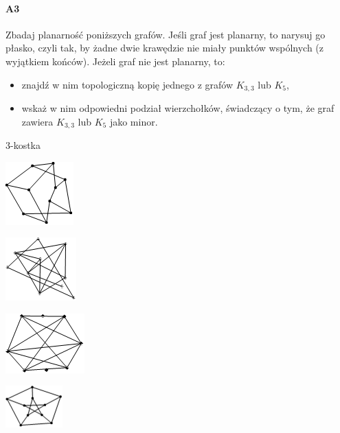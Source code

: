 \paragraph{A3} Zbadaj planarność poniższych grafów. Jeśli graf jest planarny, to narysuj go płasko, czyli tak, by żadne dwie krawędzie nie miały punktów wspólnych (z wyjątkiem końców). Jeżeli graf nie jest planarny, to:
\begin{itemize}
\item znajdź w nim topologiczną kopię jednego z grafów $K_{3,3}$ lub $K_5$,
\item wskaż w nim odpowiedni podział wierzchołków, świadczący o tym, że graf zawiera $K_{3,3}$ lub $K_5$ jako minor.
\end{itemize}
\begin{enumerate}[label=\alph*)]
\begin{minipage}{.25\textwidth}
\item 3-kostka
\end{minipage}
\begin{minipage}{.25\textwidth}
\item \includegraphics{img/g4}
\end{minipage}
\begin{minipage}{.25\textwidth}
\item \includegraphics{img/g5}
\end{minipage}
\begin{minipage}{.25\textwidth}
\item \includegraphics{img/g6}
\end{minipage}
\begin{minipage}{.25\textwidth}
\item \includegraphics{img/g7}
\end{minipage}
\end{enumerate}

